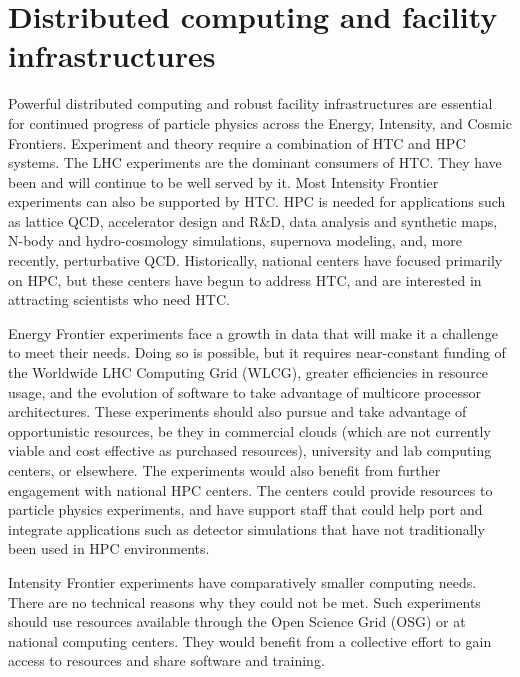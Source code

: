 \section{Distributed computing and facility infrastructures}

Powerful distributed computing and robust facility infrastructures are essential for continued progress of particle physics across the Energy, Intensity, and Cosmic Frontiers.  Experiment and theory require a combination of HTC and HPC systems.  The LHC experiments are the dominant consumers of HTC.  They have been and will continue to be well served by it.  Most Intensity Frontier experiments can also be supported by HTC.  HPC is needed for applications such as lattice QCD, accelerator design and R\&D, data analysis and synthetic maps, N-body and hydro-cosmology simulations, supernova modeling, and, more recently, perturbative QCD.  Historically, national centers have focused primarily on HPC, but these centers have begun to address HTC, and are interested in attracting scientists who need HTC.

Energy Frontier experiments face a growth in data that will make it a challenge to meet their needs.  Doing so is possible, but it requires near-constant funding of the Worldwide LHC Computing Grid (WLCG), greater efficiencies in resource usage, and the evolution of software to take advantage of multicore processor architectures.   These experiments should also pursue and take advantage of opportunistic resources, be they in commercial clouds (which are not currently viable and cost effective as purchased resources), university and lab computing centers, or elsewhere.  The experiments would also benefit from further engagement with national HPC centers.  The centers could provide resources to particle physics experiments, and have support staff that could help port and integrate applications such as detector simulations that have not traditionally been used in HPC environments.

Intensity Frontier experiments have comparatively smaller computing needs.  There are no technical reasons why they could not be met.  Such experiments should  use resources available through the Open Science Grid (OSG) or at national computing centers.  They would benefit from a collective effort to gain access to resources and share software and training.

